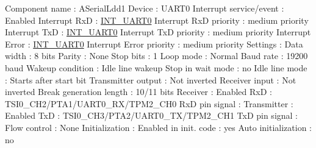 \begin{DoxyCode}
            Component name                                 : ASerialLdd1
            Device                                         : UART0
            Interrupt service/event                        : Enabled
              Interrupt RxD                                : \hyperlink{group___interrupt__vector__numbers_gga5f3656e2a154b64aa378a2f3856c3a8da85284e700459e876405861bb9e99467a}{INT\_UART0}
              Interrupt RxD priority                       : medium priority
              Interrupt TxD                                : \hyperlink{group___interrupt__vector__numbers_gga5f3656e2a154b64aa378a2f3856c3a8da85284e700459e876405861bb9e99467a}{INT\_UART0}
              Interrupt TxD priority                       : medium priority
              Interrupt Error                              : \hyperlink{group___interrupt__vector__numbers_gga5f3656e2a154b64aa378a2f3856c3a8da85284e700459e876405861bb9e99467a}{INT\_UART0}
              Interrupt Error priority                     : medium priority
            Settings                                       : 
              Data width                                   : 8 bits
              Parity                                       : None
              Stop bits                                    : 1
              Loop mode                                    : Normal
              Baud rate                                    : 19200 baud
              Wakeup condition                             : Idle line wakeup
              Stop in wait mode                            : no
              Idle line mode                               : Starts after start bit
              Transmitter output                           : Not inverted
              Receiver input                               : Not inverted
              Break generation length                      : 10/11 bits
              Receiver                                     : Enabled
                RxD                                        : TSI0\_CH2/PTA1/UART0\_RX/TPM2\_CH0
                RxD pin signal                             : 
              Transmitter                                  : Enabled
                TxD                                        : TSI0\_CH3/PTA2/UART0\_TX/TPM2\_CH1
                TxD pin signal                             : 
              Flow control                                 : None
            Initialization                                 : 
              Enabled in init. code                        : yes
              Auto initialization                          : no

\end{DoxyCode}
